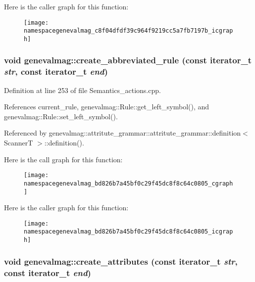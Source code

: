 Here is the caller graph for this function:\nopagebreak
\begin{figure}[H]
\begin{center}
\leavevmode
\texttt{[image: namespacegenevalmag\_c8f04dfdf39c964f9219cc5a7fb7197b\_icgraph]}
\end{center}
\end{figure}
\hypertarget{namespacegenevalmag_bd826b7a45bf0c29f45dc8f8c64c0805}{
\subsubsection[{create\_\-abbreviated\_\-rule}]{\setlength{\rightskip}{0pt plus 5cm}void genevalmag::create\_\-abbreviated\_\-rule (const iterator\_\-t {\em str}, \/  const iterator\_\-t {\em end})}}
\label{namespacegenevalmag_bd826b7a45bf0c29f45dc8f8c64c0805}




Definition at line 253 of file Semantics\_\-actions.cpp.

References current\_\-rule, genevalmag::Rule::get\_\-left\_\-symbol(), and genevalmag::Rule::set\_\-left\_\-symbol().

Referenced by genevalmag::attritute\_\-grammar::attritute\_\-grammar::definition$<$ ScannerT $>$::definition().

Here is the call graph for this function:\nopagebreak
\begin{figure}[H]
\begin{center}
\leavevmode
\texttt{[image: namespacegenevalmag\_bd826b7a45bf0c29f45dc8f8c64c0805\_cgraph]}
\end{center}
\end{figure}


Here is the caller graph for this function:\nopagebreak
\begin{figure}[H]
\begin{center}
\leavevmode
\texttt{[image: namespacegenevalmag\_bd826b7a45bf0c29f45dc8f8c64c0805\_icgraph]}
\end{center}
\end{figure}
\hypertarget{namespacegenevalmag_640285acc8edfe19e082795784dbbd51}{
\subsubsection[{create\_\-attributes}]{\setlength{\rightskip}{0pt plus 5cm}void genevalmag::create\_\-attributes (const iterator\_\-t {\em str}, \/  const iterator\_\-t {\em end})}}
\label{namespacegenevalmag_640285acc8edfe19e082795784dbbd51}




